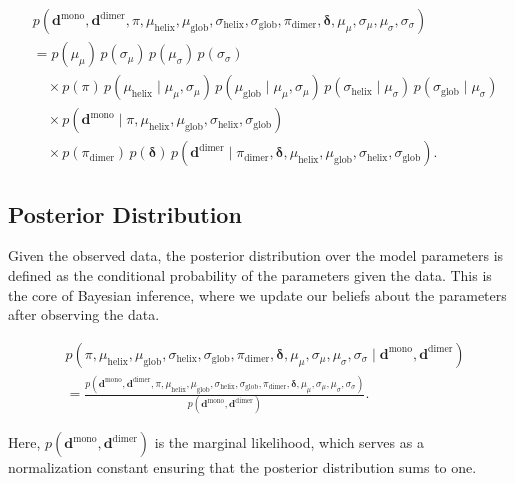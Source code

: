 \documentclass[12pt]{article}
\begin{document}
\begin{align}
    &p(\bm{d}^{\text{mono}}, \bm{d}^{\text{dimer}}, \pi, \mu_{\text{helix}}, 
    \mu_{\text{glob}}, \sigma_{\text{helix}}, \sigma_{\text{glob}}, 
    \pi_{\text{dimer}}, \bm{\delta}, \mu_{\mu}, \sigma_{\mu}, \mu_{\sigma}, \sigma_{\sigma}) \nonumber \\
    &= p(\mu_{\mu})\, p(\sigma_{\mu})\, p(\mu_{\sigma})\, p(\sigma_{\sigma}) \\
    &\quad \times p(\pi)\, p(\mu_{\text{helix}} \mid \mu_{\mu}, \sigma_{\mu})\, p(\mu_{\text{glob}} \mid \mu_{\mu}, \sigma_{\mu})\, p(\sigma_{\text{helix}} \mid \mu_{\sigma})\, p(\sigma_{\text{glob}} \mid \mu_{\sigma}) \\
    &\quad \times p(\bm{d}^{\text{mono}} \mid \pi, \mu_{\text{helix}}, \mu_{\text{glob}}, \sigma_{\text{helix}}, \sigma_{\text{glob}}) \\
    &\quad \times p(\pi_{\text{dimer}})\, p(\bm{\delta})\, p(\bm{d}^{\text{dimer}} \mid \pi_{\text{dimer}}, \bm{\delta}, \mu_{\text{helix}}, \mu_{\text{glob}}, \sigma_{\text{helix}}, \sigma_{\text{glob}}).
\end{align}

\subsection{Posterior Distribution}

Given the observed data, the posterior distribution over the model parameters is defined as the conditional probability of the parameters given the data. This is the core of Bayesian inference, where we update our beliefs about the parameters after observing the data.

\begin{align}
    &p(\pi, \mu_{\text{helix}}, \mu_{\text{glob}}, \sigma_{\text{helix}}, \sigma_{\text{glob}}, 
    \pi_{\text{dimer}}, \bm{\delta}, \mu_{\mu}, \sigma_{\mu}, \mu_{\sigma}, \sigma_{\sigma} \mid \bm{d}^{\text{mono}}, \bm{d}^{\text{dimer}}) \\
    &= \frac{p(\bm{d}^{\text{mono}}, \bm{d}^{\text{dimer}}, \pi, \mu_{\text{helix}}, 
    \mu_{\text{glob}}, \sigma_{\text{helix}}, \sigma_{\text{glob}}, 
    \pi_{\text{dimer}}, \bm{\delta}, \mu_{\mu}, \sigma_{\mu}, \mu_{\sigma}, \sigma_{\sigma})}{p(\bm{d}^{\text{mono}}, \bm{d}^{\text{dimer}})}.
\end{align}

\noindent Here, \( p(\bm{d}^{\text{mono}}, \bm{d}^{\text{dimer}}) \) is the marginal likelihood, which serves as a normalization constant ensuring that the posterior distribution sums to one.
\end{document}
